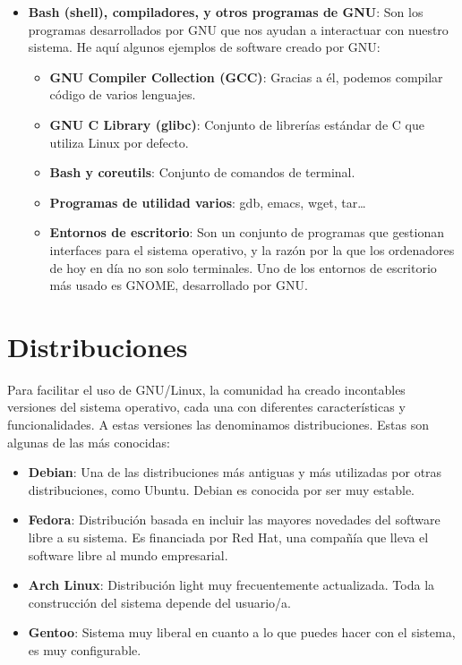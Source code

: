 \begin{itemize}
    \item \textbf{Bash (shell), compiladores, y otros programas de GNU}: Son los programas desarrollados por GNU que nos ayudan a interactuar con nuestro sistema. He aquí algunos ejemplos de software creado por GNU:

    \begin{itemize}
        \item \textbf{GNU Compiler Collection (GCC)}: Gracias a él, podemos compilar código de varios lenguajes.
        \item \textbf{GNU C Library (glibc)}: Conjunto de librerías estándar de C que utiliza Linux por defecto.
        \item \textbf{Bash y coreutils}: Conjunto de comandos de terminal.
        \item \textbf{Programas de utilidad varios}: gdb, emacs, wget, tar…
        \item \textbf{Entornos de escritorio}: Son un conjunto de programas que gestionan interfaces para el sistema operativo, y la razón por la que los ordenadores de hoy en día no son solo terminales. Uno de los entornos de escritorio más usado es GNOME, desarrollado por GNU.
    \end{itemize}
\end{itemize}

\section{Distribuciones}
Para facilitar el uso de GNU/Linux, la comunidad ha creado incontables versiones del sistema operativo, cada una con diferentes características y funcionalidades. A estas versiones las denominamos distribuciones. Estas son algunas de las más conocidas:

\begin{itemize}
    \item \textbf{Debian}: Una de las distribuciones más antiguas y más utilizadas por otras distribuciones, como Ubuntu. Debian es conocida por ser muy estable.
    \item \textbf{Fedora}: Distribución basada en incluir las mayores novedades del software libre a su sistema. Es financiada por Red Hat, una compañía que lleva el software libre al mundo empresarial.
    \item \textbf{Arch Linux}: Distribución light muy frecuentemente actualizada. Toda la construcción del sistema depende del usuario/a. 
    \item \textbf{Gentoo}: Sistema muy liberal en cuanto a lo que puedes hacer con el sistema, es muy configurable.
\end{itemize}